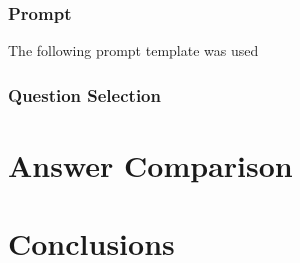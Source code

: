 \documentclass[11pt]{article}
\begin{document}
\subsubsection{Prompt}
The following prompt template was used

\subsubsection{Question Selection}



\section{Answer Comparison}



\section{Conclusions}

% 
% 
\end{document}
